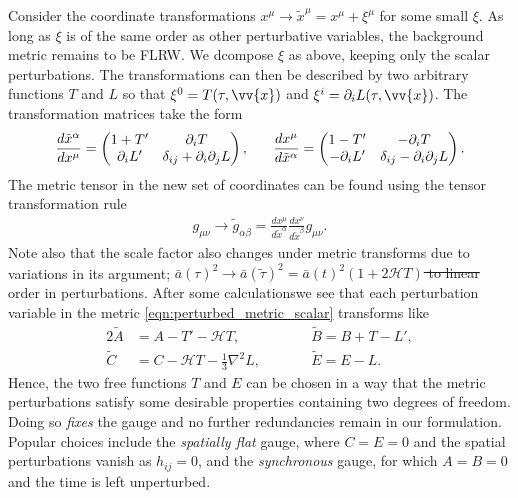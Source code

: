 \documentclass[a4paper,12pt,times,custombib,print,index]{Classes/PhDThesisPSnPDF} %
\providecommand{\DIFadd}[1]{{\protect\color{blue}\uwave{#1}}} %
\providecommand{\DIFdel}[1]{{\protect\color{red}\sout{#1}}}                      %
\providecommand{\DIFaddbegin}{} %
\providecommand{\DIFaddend}{} %
\providecommand{\DIFdelbegin}{} %
\providecommand{\DIFdelend}{} %
\newcommand{\DIFscaledelfig}{0.5}
\newlength{\DIFdelgraphicswidth} %
\newlength{\DIFdelgraphicsheight} %
\newcommand{\DIFaddincludegraphics}[2][]{{\color{blue}\fbox{\DIFOincludegraphics[#1]{#2}}}} %
\newcommand{\DIFdelincludegraphics}[2][]{%
\sbox{\DIFdelgraphicsbox}{\DIFOincludegraphics[#1]{#2}}%
\settoboxwidth{\DIFdelgraphicswidth}{\DIFdelgraphicsbox} %
\settoboxtotalheight{\DIFdelgraphicsheight}{\DIFdelgraphicsbox} %
\scalebox{\DIFscaledelfig}{%
\parbox[b]{\DIFdelgraphicswidth}{\usebox{\DIFdelgraphicsbox}\\[-\baselineskip] \rule{\DIFdelgraphicswidth}{0em}}\llap{\resizebox{\DIFdelgraphicswidth}{\DIFdelgraphicsheight}{%
\setlength{\unitlength}{\DIFdelgraphicswidth}%
\begin{picture}(1,1)%
\thicklines\linethickness{2pt} %
{\color[rgb]{1,0,0}\put(0,0){\framebox(1,1){}}}%
{\color[rgb]{1,0,0}\put(0,0){\line( 1,1){1}}}%
{\color[rgb]{1,0,0}\put(0,1){\line(1,-1){1}}}%
\end{picture}%
}\hspace*{3pt}}} %
} %
\DeclareRobustCommand{\DIFaddbegin}{\DIFOaddbegin \let\includegraphics\DIFaddincludegraphics} %
\DeclareRobustCommand{\DIFaddend}{\DIFOaddend \let\includegraphics\DIFOincludegraphics} %
\DeclareRobustCommand{\DIFdelbegin}{\DIFOdelbegin \let\includegraphics\DIFdelincludegraphics} %
\DeclareRobustCommand{\DIFdelend}{\DIFOaddend \let\includegraphics\DIFOincludegraphics} %
\begin{document}
Consider the coordinate transformations $x^\mu \rightarrow \tilde{x}^\mu = x^\mu + \xi^\mu$ for some small $\xi$. As long as $\xi$ is of the same order as other perturbative variables, the background metric remains to be FLRW. We dcompose $\xi$ as above, keeping only the scalar perturbations. The transformations can then be described by two arbitrary functions $T$ and $L$ so that $\xi^0 = T(\tau,\vv{x})$ and $\xi^i = \partial_i L(\tau,\vv{x})$. The transformation matrices take the form
\begin{align}
	\frac{d\tilde{x}^\alpha}{dx^\mu} = \begin{pmatrix}
		1 + T' & \partial_i T \\ \partial_i L' & \delta_{ij} + \partial_i \partial_j L
	\end{pmatrix},
	\hspace{0.05\linewidth}
	\frac{dx^\mu}{d\tilde{x}^\alpha} = \begin{pmatrix}
		1 - T' & -\partial_i T \\ -\partial_i L' & \delta_{ij} - \partial_i \partial_j L
	\end{pmatrix}. \DIFaddbegin \label{eqn:gauge_transformation_matrix}
\DIFaddend \end{align}
The metric tensor in the new set of coordinates can be found using the tensor transformation rule
\begin{align}
	g_{\mu\nu} \rightarrow \tilde{g}_{\alpha\beta} = \frac{dx^\mu}{d\tilde{x}^\alpha} \frac{dx^\nu}{d\tilde{x}^\beta} g_{\mu\nu}.
\end{align}
Note also that the scale factor also changes under 
metric transforms due to variations in its argument;  \DIFdelbegin \DIFdel{$\bar{a}(\tau)^2 \rightarrow \bar{a}(\tilde{\tau})^2 = \bar{a}(t)^2 (1 + 2 \mathcal{H} T)$ to linear }\DIFdelend \DIFaddbegin \DIFadd{$a(\tau)^2 \rightarrow a(\tilde{\tau})^2 = a(t)^2 (1 + 2 \mathcal{H} T)$ at first }\DIFaddend order in perturbations. After some calculations\DIFaddbegin \DIFadd{, }\DIFaddend we see that each perturbation variable in the metric \eqref{eqn:perturbed_metric_scalar} transforms like
\begin{alignat}{2}
	\tilde{A} &= A - T' - \mathcal{H}T, \qquad &&\tilde{B} = B + T - L', \label{eqn:gauge_transform_perturbations_1}\\
	\tilde{C} &= C - \mathcal{H}T - \frac{1}{3}\nabla^2 L, \qquad &&\tilde{E} = E - L. \label{eqn:gauge_transform_perturbations_2}
\end{alignat}
Hence, the two free functions $T$ and $E$ can be chosen in a way that the metric perturbations satisfy some desirable properties containing two degrees of freedom. Doing so \textit{fixes} the gauge and no further redundancies remain in our formulation. Popular choices include the \textit{spatially flat} gauge, where $C=E=0$ and the spatial perturbations vanish as $h_{ij}=0$, and the \textit{synchronous} gauge, for which $A=B=0$ and the time is left unperturbed.
\end{document}
